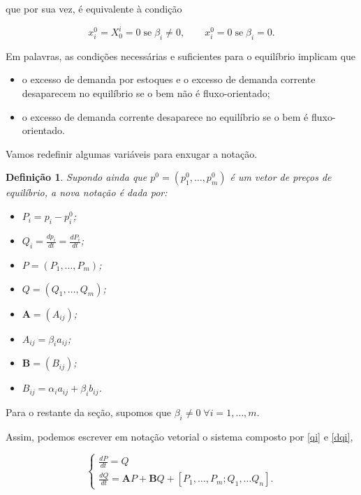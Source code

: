 \documentclass[
	12pt,				%
	openright,			%
	twoside,			%
	a4paper,			%
	english,			%
	french,				%
	spanish,			%
	brazil				%
	]{abntex2}
\newtheorem{definicao}{Definição}[chapter]
\newcommand{\B}{\boldsymbol{B}}
\newcommand{\A}{\boldsymbol{A}}
\begin{document}
que por sua vez, é equivalente à condição

\begin{equation}
	x_i^0 = X^i_0 = 0 \; \text{se} \; \beta_i \neq 0, \qquad x_i^0 = 0 \; \text{se} \; \beta_i = 0.
\end{equation}

Em palavras, as condições necessárias e suficientes para o equilíbrio implicam que

\begin{itemize}
	\item o excesso de demanda por estoques e o excesso de demanda corrente desaparecem no equilíbrio se o bem não é fluxo-orientado;
	\item o excesso de demanda corrente desaparece no equilíbrio se o bem é fluxo-orientado.
\end{itemize}


Vamos redefinir algumas variáveis para enxugar a notação.

\begin{definicao} Supondo ainda que $p^0 = (p^0_1, \ldots, p^0_m)$ é um vetor de preços de equilíbrio,
	a nova notação é dada por:
 \begin{itemize}
 	\item $P_i = p_i - p_i^0$;
	\item $Q_i = \frac{dp_i}{dt} = \frac{dP_i}{dt}$;
	\item $P = (P_1, \ldots, P_m)$;
	\item $Q = (Q_1, \ldots, Q_m)$;
	\item $\A = (\mathit{A_{ij}})$;
	\item $\mathit{A_{ij}} = \beta_i a_{ij}$;
	\item $\B = (\mathit{B_{ij}})$;
	\item $\mathit{B_{ij}} = \alpha_i a_{ij} + \beta_i  b_{ij}$.
 \end{itemize}
\end{definicao}

Para o restante da seção, supomos que $\beta_i \neq 0 \; \forall i = 1, \ldots, m$.

Assim, podemos escrever em notação vetorial o sistema composto por \ref{qi} e \ref{dqi},

\begin{equation} \label{eqnlin}
	\begin{cases}
		\frac{dP}{dt} = Q \\
		\frac{dQ}{dt} = \textbf{A}P + \textbf{B}Q + [P_1, \ldots, P_m; Q_1, \ldots Q_n].
	\end{cases}
\end{equation}
\end{document}
